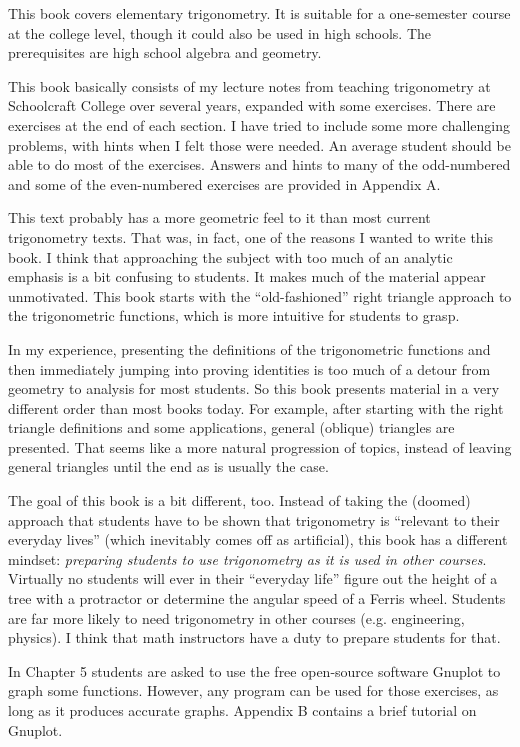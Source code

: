 This book covers elementary trigonometry. It is suitable for a one-semester course at the college
level, though it could also be used in high schools. The prerequisites are high school algebra and
geometry.

This book basically consists of my lecture notes from teaching trigonometry at Schoolcraft College
over several years, expanded with some exercises. There are exercises at the end of each section.
I have tried to include some
more challenging problems, with hints when I felt those were needed. An average student should be
able to do most of the exercises. Answers and hints to many of the odd-numbered and some of the
even-numbered exercises are provided in Appendix A.

This text probably has a more geometric feel to it than most current trigonometry texts.
That was, in fact, one of the reasons I wanted to write this book. I think that approaching the
subject with too much of an analytic emphasis is a bit confusing to students. It makes much of the
material appear unmotivated. This book starts with the ``old-fashioned'' right triangle approach to
the trigonometric functions, which is more intuitive for students to grasp.

In my experience, presenting the definitions of the trigonometric
functions and then immediately jumping into proving identities is too much of a detour from
geometry to analysis for most students.
So this book presents material in a very different order than most books today. For
example, after starting with the right triangle definitions and some applications, general (oblique)
triangles are presented. That seems like a more natural progression of topics, instead of leaving
general triangles until the end as is usually the case.

The goal of this book is a bit different, too. Instead of taking the (doomed) approach that students
have to be shown that trigonometry is ``relevant to their everyday lives'' (which inevitably comes
off as artificial), this book has a different mindset:
\emph{preparing students to use trigonometry as it is used in other courses}.
Virtually no students will ever in their ``everyday life'' figure out the height of a tree
with a protractor or determine the angular speed of a Ferris wheel.
Students are far more likely to need trigonometry in other courses (e.g. engineering, physics).
I think that math instructors have a duty to prepare students for that.

In Chapter 5 students are asked to use the free open-source software Gnuplot to graph
some functions. However, any program can be used for those exercises, as long as it produces
accurate graphs. Appendix B contains a brief tutorial on Gnuplot.

